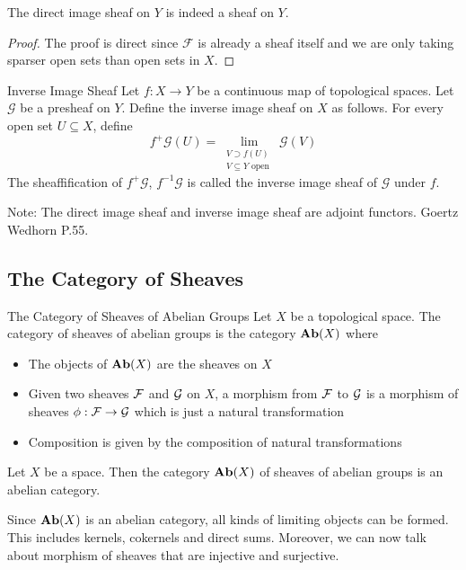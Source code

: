\documentclass[a4paper]{article}
\begin{document}
\begin{prp}{}{} The direct image sheaf on $Y$ is indeed a sheaf on $Y$. \tcbline
\begin{proof}
The proof is direct since $\mathcal{F}$ is already a sheaf itself and we are only taking sparser open sets than open sets in $X$. 
\end{proof}
\end{prp}

\begin{defn}{Inverse Image Sheaf}{} Let $f:X\to Y$ be a continuous map of topological spaces. Let $\mathcal{G}$ be a presheaf on $Y$. Define the inverse image sheaf on $X$ as follows. For every open set $U\subseteq X$, define $$f^+\mathcal{G}(U)=\lim_{\substack{V\supset f(U)\\V\subseteq Y\text{ open }}}\mathcal{G}(V)$$ The sheaffification of $f^+\mathcal{G}$, $f^{-1}\mathcal{G}$ is called the inverse image sheaf of $\mathcal{G}$ under $f$. 
\end{defn}

Note: The direct image sheaf and inverse image sheaf are adjoint functors. Goertz Wedhorn P.55. 

\subsection{The Category of Sheaves}
\begin{defn}{The Category of Sheaves of Abelian Groups}{} Let $X$ be a topological space. The category of sheaves of abelian groups is the category $\bold{Ab}(X)$ where
\begin{itemize}
\item The objects of $\bold{Ab}(X)$ are the sheaves on $X$
\item Given two sheaves $\mathcal{F}$ and $\mathcal{G}$ on $X$, a morphism from $\mathcal{F}$ to $\mathcal{G}$ is a morphism of sheaves $\phi:\mathcal{F}\to\mathcal{G}$ which is just a natural transformation
\item Composition is given by the composition of natural transformations
\end{itemize}
\end{defn}

\begin{thm}{}{} Let $X$ be a space. Then the category $\bold{Ab}(X)$ of sheaves of abelian groups is an abelian category. 
\end{thm}

Since $\bold{Ab}(X)$ is an abelian category, all kinds of limiting objects can be formed. This includes kernels, cokernels and direct sums. Moreover, we can now talk about morphism of sheaves that are injective and surjective. 
\end{document}

